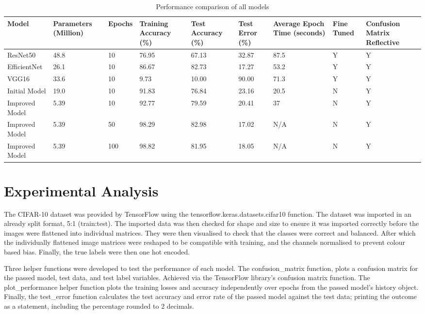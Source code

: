 \documentclass[10pt,twocolumn,letterpaper]{article}
\begin{document}
\begin{table}[!ht]
\centering
\begin{tabular}{|L|L|L|L|L|L|L|L|L|}
\hline
\textbf{Model} & \textbf{Parameters (Million)} & \textbf{Epochs} & \textbf{Training Accuracy (\%)} & \textbf{Test Accuracy (\%)} & \textbf{Test Error (\%)} & \textbf{Average Epoch Time (seconds)} & \textbf{Fine Tuned} & \textbf{Confusion Matrix Reflective} \\ \hline \hline
ResNet50 & 48.8 & 10 & 76.95 & 67.13 & 32.87 & 87.5 & Y & Y \\ \hline
EfficientNet & 26.1 & 10 & 86.67 & 82.73 & 17.27 & 53.2 & Y & Y \\ \hline
VGG16 & 33.6 & 10 & 9.73 & 10.00 & 90.00 & 71.3 & Y & Y \\ \hline
Initial Model & 19.0 & 10 & 91.83 & 76.84 & 23.16 & 20.5 & N & Y \\ \hline
Improved Model & 5.39 & 10 & 92.77 & 79.59 & 20.41 & 37 & N & Y \\ \hline
Improved Model & 5.39 & 50 & 98.29 & 82.98 & 17.02 & N/A & N & Y \\ \hline
Improved Model & 5.39 & 100 & 98.82 & 81.95 & 18.05 & N/A & N & Y \\ \hline
\end{tabular}
\caption{Performance comparison of all models}
\label{tab:model_performance}
\end{table}

\section{Experimental Analysis}
\label{sec:expana}
The CIFAR-10 dataset was provided by TensorFlow using the tensorflow.keras.datasets.cifar10 function. The dataset was imported in an already split format, 5:1 (train:test). The imported data was then checked for shape and size to ensure it was imported correctly before the images were flattened into individual matrices. They were then visualised to check that the classes were correct and balanced. After which the individually flattened image matrices were reshaped to be compatible with training, and the channels normalised to prevent colour based bias. Finally, the true labels were then one hot encoded. 

Three helper functions were developed to test the performance of each model. The confusion\_matrix function, plots a confusion matrix for the passed model, test data, and test label variables. Achieved via the TensorFlow library's confusion matrix function. The plot\_performance helper function plots the training losses and accuracy independently over epochs from the passed model's history object. Finally, the test\_error function calculates the test accuracy and error rate of the passed model against the test data; printing the outcome as a statement, including the percentage rounded to 2 decimals. 
\end{document}
